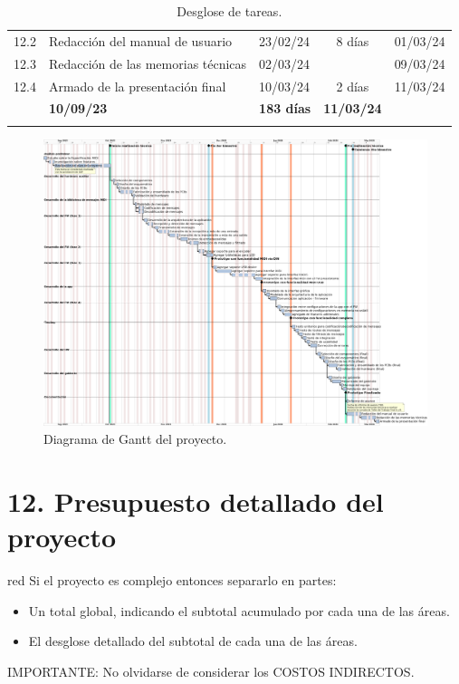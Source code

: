 \documentclass[
11pt, %
]{charter}
\begin{document}
\begin{longtable}[c]{|cllcl|}
	12.2 & Redacción del manual de usuario & 23/02/24 & 8 días & 01/03/24 \\
	12.3 & Redacción de las memorias técnicas & 02/03/24 &  & 09/03/24 \\
	\rowcolor[HTML]{EFEFEF} 
	12.4 & Armado de la presentación final & 10/03/24 & 2 días & 11/03/24 \\ \hline
	\rowcolor[HTML]{DAE8FC} 
	\multicolumn{2}{|c}{\cellcolor[HTML]{DAE8FC}\textbf{Tiempo total}} & \textbf{10/09/23} & \multicolumn{1}{l}{\cellcolor[HTML]{DAE8FC}\textbf{183 días}} & \textbf{11/03/24} \\ \hline
	\caption{Desglose de tareas.}
	\label{tab:gantt-table}\\
\end{longtable}

\begin{landscape}
	\begin{figure}[h!]
		\centering 
		\includegraphics[height=1.05\textheight]{./Figuras/gantt.png}
		\caption{Diagrama de Gantt del proyecto.}
		\label{fig:diagGantt}
	\end{figure}
\end{landscape}

\section{12. Presupuesto detallado del proyecto}
\label{sec:presupuesto}

\begin{consigna}{red}
Si el proyecto es complejo entonces separarlo en partes:
\begin{itemize}
	\item Un total global, indicando el subtotal acumulado por cada una de las áreas.
	\item El desglose detallado del subtotal de cada una de las áreas.
\end{itemize}

IMPORTANTE: No olvidarse de considerar los COSTOS INDIRECTOS.

\end{consigna}
\end{document}
